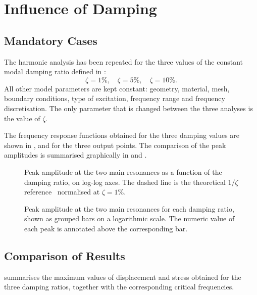 \section{Influence of Damping}
\label{sec:damping}

\subsection{Mandatory Cases}

The harmonic analysis has been repeated for the three values of the constant modal damping ratio defined in :
\begin{equation*}
    \zeta = 1\%,\quad \zeta = 5\%,\quad \zeta = 10\%.
\end{equation*}
All other model parameters are kept constant: geometry, material, mesh, boundary conditions, type of excitation, frequency range and frequency discretisation. The only parameter that is changed between the three analyses is the value of $\zeta$.

The frequency response functions obtained for the three damping values are shown in ,  and  for the three output points. The comparison of the peak amplitudes is summarised graphically in  and .

\begin{figure}[H]
    \centering
    
    \caption{Peak amplitude at the two main resonances as a function of the damping ratio, on log-log axes. The dashed line is the theoretical $1/\zeta$ reference~\cite{inman_engineering_vibration} normalised at $\zeta = 1\%$.}
    \label{fig:peak_vs_damping}
\end{figure}

\begin{figure}[H]
    \centering
    
    \caption{Peak amplitude at the two main resonances for each damping ratio, shown as grouped bars on a logarithmic scale. The numeric value of each peak is annotated above the corresponding bar.}
    \label{fig:peak_bars}
\end{figure}

\subsection{Comparison of Results}

 summarises the maximum values of displacement and stress obtained for the three damping ratios, together with the corresponding critical frequencies.

